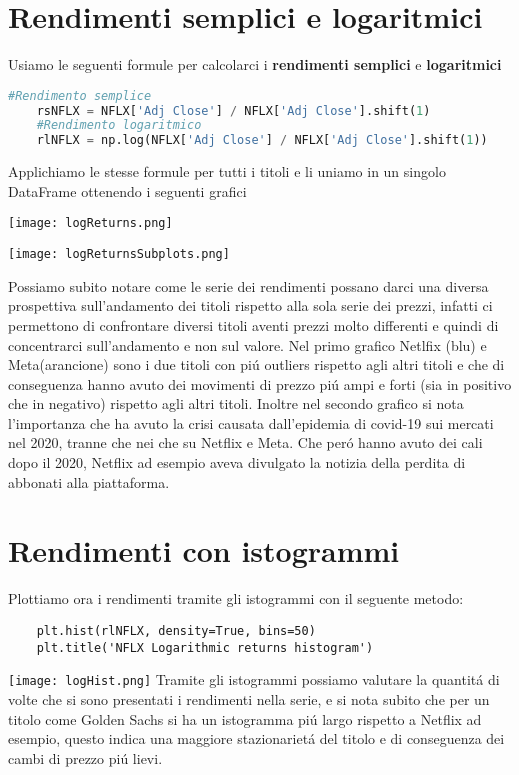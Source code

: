 \documentclass{report}
\begin{document}
\section{Rendimenti semplici e logaritmici}
Usiamo le seguenti formule per calcolarci i \textbf{rendimenti semplici} e \textbf{logaritmici}
\begin{lstlisting}[language=python]
    #Rendimento semplice
    rsNFLX = NFLX['Adj Close'] / NFLX['Adj Close'].shift(1)
    #Rendimento logaritmico
    rlNFLX = np.log(NFLX['Adj Close'] / NFLX['Adj Close'].shift(1))
\end{lstlisting}
Applichiamo le stesse formule per tutti i titoli e li uniamo in un singolo DataFrame ottenendo i seguenti grafici

\texttt{[image: logReturns.png]}

\texttt{[image: logReturnsSubplots.png]}

Possiamo subito notare come le serie dei rendimenti possano darci una diversa prospettiva sull'andamento dei titoli rispetto alla sola serie dei prezzi, infatti ci permettono di confrontare diversi titoli aventi prezzi molto differenti e quindi di concentrarci sull'andamento e non sul valore. Nel primo grafico Netlfix (blu) e Meta(arancione) sono i due titoli con piú outliers rispetto agli altri titoli e che di conseguenza hanno avuto dei movimenti di prezzo  piú ampi e forti (sia in positivo che in negativo) rispetto agli altri titoli. Inoltre nel secondo grafico si nota l'importanza che ha avuto la crisi causata dall'epidemia di covid-19 sui mercati nel 2020, tranne che nei che su Netflix e Meta. Che peró hanno avuto dei cali dopo il 2020, Netflix ad esempio aveva divulgato la notizia della perdita di abbonati alla piattaforma.
\section{Rendimenti con istogrammi}
Plottiamo ora i rendimenti tramite gli istogrammi con il seguente metodo:
\begin{lstlisting}
    plt.hist(rlNFLX, density=True, bins=50)
    plt.title('NFLX Logarithmic returns histogram')
\end{lstlisting}

\texttt{[image: logHist.png]}
Tramite gli istogrammi possiamo valutare la quantitá di volte che si sono presentati i rendimenti nella serie, e si nota subito che per un titolo come Golden Sachs si ha un istogramma piú largo rispetto a Netflix ad esempio, questo indica una maggiore stazionarietá del titolo e di conseguenza dei cambi di prezzo piú lievi.
\end{document}
